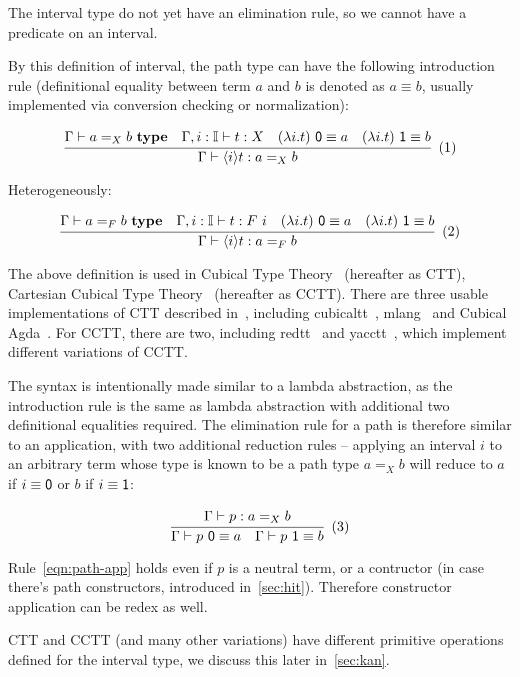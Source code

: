 The interval type do not yet have an elimination rule,
so we cannot have a predicate on an interval.

By this definition of interval, the path type can
have the following introduction rule
(definitional equality between term $a$ and $b$
is denoted as $a \equiv b$,
usually implemented via conversion checking or normalization):

\[
  \cfrac{
    \Gamma \vdash a =_X b \ \textbf{type}
    \quad
    \Gamma, i : \mathbb I \vdash t : X
    \quad
    (\lambda i. t) \ \textsf 0 \equiv a
    \quad
    (\lambda i. t) \ \textsf 1 \equiv b
  }{
    \Gamma \vdash \lrangle i t : a =_X b
  }
  \xtag
\]

Heterogeneously:

\[
  \cfrac{
    \Gamma \vdash a =_F b \ \textbf{type}
    \quad
    \Gamma, i : \mathbb I \vdash t : F \ i
    \quad
    (\lambda i. t) \ \textsf 0 \equiv a
    \quad
    (\lambda i. t) \ \textsf 1 \equiv b
  }{
    \Gamma \vdash \lrangle i t : a =_F b
  }
  \xtag
\]

The above definition is used in Cubical Type Theory~\cite{CCHM,CHM}
(hereafter as CTT), Cartesian Cubical Type
Theory~\cite{CCTT,CCTT2,CHTT} (hereafter as CCTT).
There are three usable implementations of CTT described in~\cite{CHM},
including cubicaltt~\cite{CubicalTT},
mlang~\cite{Mlang} and Cubical Agda~\cite{CubicalAgda}.
For CCTT, there are two, including
redtt~\cite{RedTT} and yacctt~\cite{YaccTT},
which implement different variations of CCTT.

The syntax is intentionally made similar to a lambda abstraction,
as the introduction rule is the same as lambda abstraction with
additional two definitional equalities required.
The elimination rule for a path is therefore similar to an application,
with two additional reduction rules -- applying an interval $i$ to
an arbitrary term whose type is known to be a path type $a =_X b$
will reduce to $a$ if $i \equiv \textsf 0$ or $b$ if $i \equiv \textsf 1$:

\[
  \cfrac{
    \Gamma \vdash p : a =_X b
  }{
    \Gamma \vdash p\ \textsf 0 \equiv a
    \quad
    \Gamma \vdash p\ \textsf 1 \equiv b
  }
  \xtag \label{eqn:path-app}
\]

Rule~\ref{eqn:path-app} holds even if $p$ is a neutral term,
or a contructor (in case there's path constructors,
introduced in~\cref{sec:hit}).
Therefore constructor application can be redex as well.

CTT and CCTT (and many other variations) have different primitive
operations defined for the interval type,
we discuss this later in~\cref{sec:kan}.

